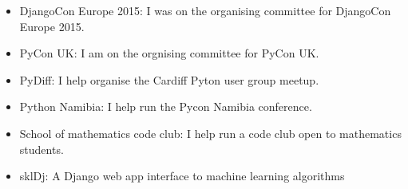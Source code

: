 \documentclass[10pt]{res} %
\begin{document}
\begin{resume}
\begin{itemize}
    \item DjangoCon Europe 2015: I was on the organising committee for DjangoCon Europe 2015.

    \item PyCon UK: I am on the orgnising committee for PyCon UK.

    \item PyDiff: I help organise the Cardiff Pyton user group meetup.

    \item Python Namibia: I help run the Pycon Namibia conference.

    \item School of mathematics code club: I help run a code club open to mathematics students.

    \item sklDj: A Django web app interface to machine learning algorithms

\end{itemize}

\end{resume}
\end{document}

